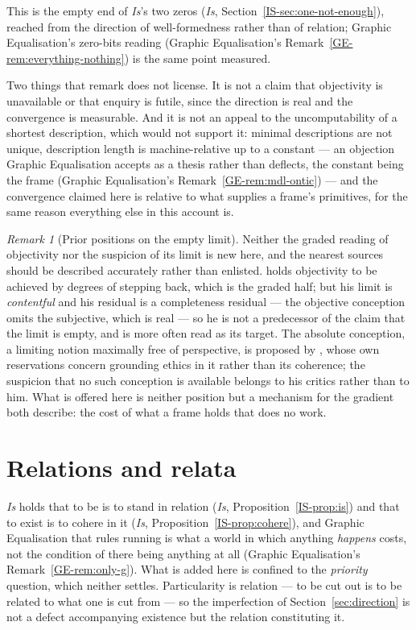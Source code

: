 \documentclass[11pt,a4paper]{article}
\theoremstyle{remark}\newtheorem{remark}[definition]{Remark}
\begin{document}
This is the empty end of \emph{Is}'s two zeros (\emph{Is}, Section~\ref{IS-sec:one-not-enough}),
reached from the direction of well-formedness rather than of relation; Graphic Equalisation's
zero-bits reading (Graphic Equalisation's Remark~\ref{GE-rem:everything-nothing}) is the same point measured.

Two things that remark does not license. It is not a claim that objectivity is unavailable or that
enquiry is futile, since the direction is real and the convergence is measurable. And it is not an
appeal to the uncomputability of a shortest description, which would not support it: minimal
descriptions are not unique, description length is machine-relative up to a constant --- an objection
Graphic Equalisation accepts as a thesis rather than deflects, the constant being the frame (Graphic
Equalisation's Remark~\ref{GE-rem:mdl-ontic}) --- and the convergence claimed here is relative to what supplies a frame's primitives, for the same reason
everything else in this account is.

\begin{remark}[Prior positions on the empty limit]\label{rem:nowhere-prior}
Neither the graded reading of objectivity nor the suspicion of its limit is new here, and the nearest
sources should be described accurately rather than enlisted. \citet{nagel1986} holds objectivity to be
achieved by degrees of stepping back, which is the graded half; but his limit is \emph{contentful} and
his residual is a completeness residual --- the objective conception omits the subjective, which is
real --- so he is not a predecessor of the claim that the limit is empty, and is more often read as
its target. The absolute conception, a limiting notion maximally free of perspective, is proposed by
\citet{williams1978}, whose own reservations concern grounding ethics in it rather than its
coherence; the suspicion that no such conception is available belongs to his critics rather than to
him. What is offered here is neither position but a mechanism for the gradient both describe: the
cost of what a frame holds that does no work.
\end{remark}

\section{Relations and relata}\label{sec:relation}

\emph{Is} holds that to be is to stand in relation (\emph{Is}, Proposition~\ref{IS-prop:is}) and that
to exist is to cohere in it (\emph{Is}, Proposition~\ref{IS-prop:cohere}), and Graphic Equalisation
that rules running is what a world in which anything \emph{happens} costs, not the condition of there
being anything at all (Graphic Equalisation's Remark~\ref{GE-rem:only-g}). What is added here is
confined to the \emph{priority} question, which neither settles. Particularity is relation --- to be cut out is to be
related to what one is cut from --- so the imperfection of Section~\ref{sec:direction} is not a defect
accompanying existence but the relation constituting it.
\end{document}
